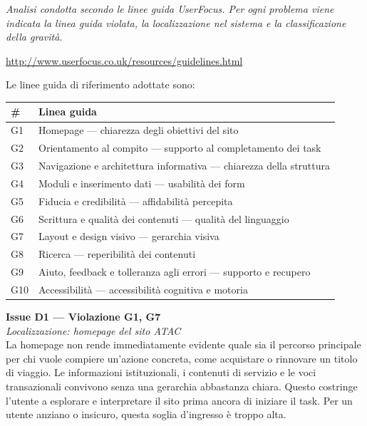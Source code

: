 ﻿\documentclass[11pt,a4paper]{article}
\begin{document}
\noindent\textit{Analisi condotta secondo le linee guida UserFocus. Per ogni problema viene indicata la linea guida violata, la localizzazione nel sistema e la classificazione della gravità.}\\[2pt]
\raggedright\url{http://www.userfocus.co.uk/resources/guidelines.html}\par

\bigskip

\noindent Le linee guida di riferimento adottate sono:

\begin{tabular}{ll}
\toprule
\textbf{\#} & \textbf{Linea guida} \\
\midrule
G1 & Homepage — chiarezza degli obiettivi del sito \\
G2 & Orientamento al compito — supporto al completamento dei task \\
G3 & Navigazione e architettura informativa — chiarezza della struttura \\
G4 & Moduli e inserimento dati — usabilità dei form \\
G5 & Fiducia e credibilità — affidabilità percepita \\
G6 & Scrittura e qualità dei contenuti — qualità del linguaggio \\
G7 & Layout e design visivo — gerarchia visiva \\
G8 & Ricerca — reperibilità dei contenuti \\
G9 & Aiuto, feedback e tolleranza agli errori — supporto e recupero \\
G10 & Accessibilità — accessibilità cognitiva e motoria \\
\bottomrule
\end{tabular}

\bigskip

\noindent\textbf{Issue D1 — Violazione G1, G7}\label{atac:D1}\\
\textit{Localizzazione: homepage del sito ATAC}\\

\noindent La homepage non rende immediatamente evidente quale sia il percorso principale per chi vuole compiere un’azione concreta, come acquistare o rinnovare un titolo di viaggio. Le informazioni istituzionali, i contenuti di servizio e le voci transazionali convivono senza una gerarchia abbastanza chiara. Questo costringe l’utente a esplorare e interpretare il sito prima ancora di iniziare il task. Per un utente anziano o insicuro, questa soglia d’ingresso è troppo alta.
\end{document}
